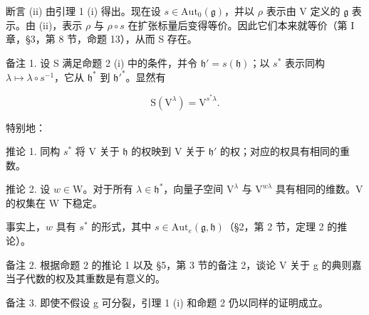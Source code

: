 断言 (ii) 由引理 1 (i) 得出。现在设 \(s \in \mathrm{Aut}_0(\mathfrak{g})\)，并以 \(\rho\) 表示由 V 定义的 \(\mathfrak{g}\) 表示。由 (ii)，表示 \(\rho\) 与 \(\rho \circ s\) 在扩张标量后变得等价。因此它们本来就等价（第 I 章，§3，第 8 节，命题 13），从而 S 存在。

备注 1. 设 S 满足命题 2 (i) 中的条件，并令 \(\mathfrak{h}' = s(\mathfrak{h})\)；以 \(s^*\) 表示同构 \(\lambda \mapsto \lambda \circ s^{-1}\)，它从 \(\mathfrak{h}^*\) 到 \(\mathfrak{h}'^*\)。显然有

\[
\mathrm{S} (\mathrm{V} ^ {\lambda}) = \mathrm{V} ^ {s ^ {*} \lambda}.
\]

特别地：

推论 1. 同构 \(s^*\) 将 V 关于 \(\mathfrak{h}\) 的权映到 V 关于 \(\mathfrak{h}'\) 的权；对应的权具有相同的重数。

推论 2. 设 \(w \in \mathrm{W}\)。对于所有 \(\lambda \in \mathfrak{h}^*\)，向量子空间 \(\mathrm{V}^{\lambda}\) 与 \(\mathrm{V}^{w\lambda}\) 具有相同的维数。\(\mathrm{V}\) 的权集在 \(\mathrm{W}\) 下稳定。

事实上，\(w\) 具有 \(s^*\) 的形式，其中 \(s \in \mathrm{Aut}_e(\mathfrak{g}, \mathfrak{h})\)（§2，第 2 节，定理 2 的推论）。

备注 2. 根据命题 2 的推论 1 以及 §5，第 3 节的备注 2，谈论 V 关于 g 的典则嘉当子代数的权及其重数是有意义的。

备注 3. 即使不假设 g 可分裂，引理 1 (i) 和命题 2 仍以同样的证明成立。

